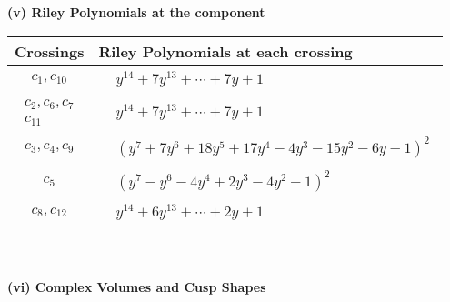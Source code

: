 \documentclass[1p]{elsarticle_modified}
\theoremstyle{definition}
\begin{document}
\newpage\renewcommand{\arraystretch}{1}
\flushleft \textbf{(v) Riley Polynomials at the component}\newline \\
\begin{tabular}{m{50pt}|m{274pt}}
Crossings & \hspace{64pt}Riley Polynomials at each crossing \\
\hline $$\begin{aligned}c_{1},c_{10}\end{aligned}$$&$\begin{aligned}
&y^{14}+7 y^{13}+\cdots+7 y+1
\end{aligned}$\\
\hline $$\begin{aligned}c_{2},c_{6},c_{7}\\c_{11}\end{aligned}$$&$\begin{aligned}
&y^{14}+7 y^{13}+\cdots+7 y+1
\end{aligned}$\\
\hline $$\begin{aligned}c_{3},c_{4},c_{9}\end{aligned}$$&$\begin{aligned}
&(y^7+7 y^6+18 y^5+17 y^4-4 y^3-15 y^2-6 y-1)^2
\end{aligned}$\\
\hline $$\begin{aligned}c_{5}\end{aligned}$$&$\begin{aligned}
&(y^7- y^6-4 y^4+2 y^3-4 y^2-1)^2
\end{aligned}$\\
\hline $$\begin{aligned}c_{8},c_{12}\end{aligned}$$&$\begin{aligned}
&y^{14}+6 y^{13}+\cdots+2 y+1
\end{aligned}$\\
\hline
\end{tabular}\\~\\
\newpage\flushleft \textbf{(vi) Complex Volumes and Cusp Shapes}
\end{document}
